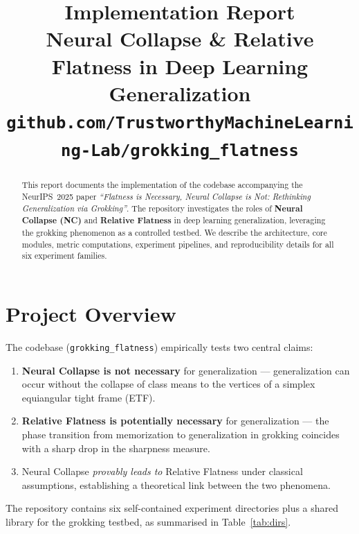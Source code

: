 \documentclass[11pt,a4paper]{article}
\title{\vspace{-1.5cm}\textbf{Implementation Report}\\[3mm]
\large Neural Collapse \& Relative Flatness in Deep Learning Generalization\\
\small\texttt{github.com/TrustworthyMachineLearning-Lab/grokking\_flatness}}
\author{}
\date{\vspace{-5mm}}
\theoremstyle{definition}
\begin{document}
\maketitle

\begin{abstract}
This report documents the implementation of the codebase accompanying the NeurIPS~2025 paper
\emph{``Flatness is Necessary, Neural Collapse is Not: Rethinking Generalization via Grokking''}.
The repository investigates the roles of \textbf{Neural Collapse (NC)} and \textbf{Relative Flatness}
in deep learning generalization, leveraging the grokking phenomenon as a controlled testbed.
We describe the architecture, core modules, metric computations, experiment pipelines, and
reproducibility details for all six experiment families.
\end{abstract}

\tableofcontents
\clearpage

\section{Project Overview}

The codebase (\texttt{grokking\_flatness}) empirically tests two central claims:

\begin{enumerate}[leftmargin=*]
    \item \textbf{Neural Collapse is not necessary} for generalization --- generalization can occur without
          the collapse of class means to the vertices of a simplex equiangular tight frame (ETF).
    \item \textbf{Relative Flatness is potentially necessary} for generalization --- the phase transition
          from memorization to generalization in grokking coincides with a sharp drop in the
          sharpness measure.
    \item Neural Collapse \emph{provably leads to} Relative Flatness under classical assumptions,
          establishing a theoretical link between the two phenomena.
\end{enumerate}

The repository contains six self-contained experiment directories plus a shared library
for the grokking testbed, as summarised in Table~\ref{tab:dirs}.
\end{document}
